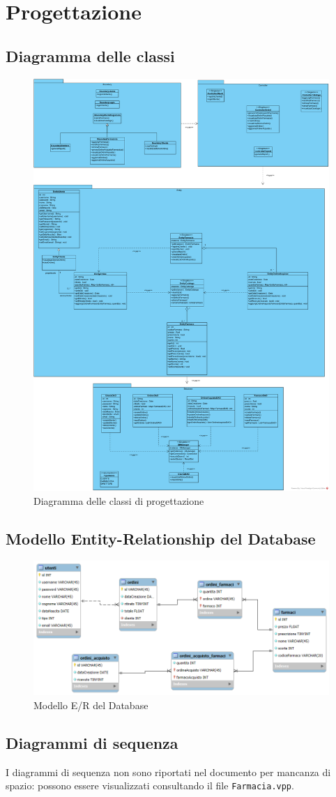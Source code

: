 \chapter{Progettazione}

\section{Diagramma delle classi}

\begin{figure}[h]
    \centering
	\includegraphics[width=0.7\linewidth]{assets/ClassDiagramProgettazione.png}
    \caption{Diagramma delle classi di progettazione}
\end{figure}

\pagebreak

\section{Modello Entity-Relationship del Database}

\begin{figure}[h]
    \centering
	\includegraphics[width=\linewidth]{assets/Modello_ER_DB.png}
    \caption{Modello E/R del Database}
\end{figure}

\section{Diagrammi di sequenza}

I diagrammi di sequenza non sono riportati nel documento per mancanza di spazio: possono essere visualizzati consultando il file \texttt{Farmacia.vpp}.